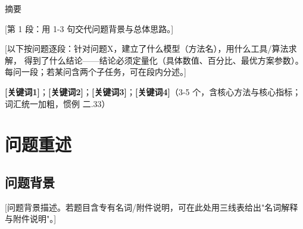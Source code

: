 \documentclass[12pt,a4paper]{ctexart}
\begin{document}
\begin{titlepage}
\thispagestyle{plain}  %
\centering
{\par}
\vspace{0.5cm}
{\heiti 摘\hspace{2em}要\par}
\vspace{0.2cm}

\begin{minipage}{0.95\textwidth}
\setlength{\parindent}{2em}
[第 1 段：用 1-3 句交代问题背景与总体思路。]

[以下按问题逐段：针对问题X，建立了什么模型（方法名），用什么工具/算法求解，
得到了什么结论——结论必须定量化（具体数值、百分比、最优方案参数）。
每问一段；若某问含两个子任务，可在段内分述。]

\vspace{0.3cm}
\textbf{[关键词1]}；\textbf{[关键词2]}；\textbf{[关键词3]}；\textbf{[关键词4]}（3-5 个，含核心方法与核心指标；词汇统一加粗，惯例 二.33）
\end{minipage}
\label{abstract:end}
\end{titlepage}

\section{问题重述}

\subsection{问题背景}

[问题背景描述。若题目含专有名词/附件说明，可在此处用三线表给出"名词解释与附件说明"。]
\end{document}

